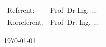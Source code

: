\begin{titlepage}
	\vspace{2.1cm}

	\centering \begin{minipage}[t]{9cm}
		\centering \begin{tabular}{ll}
			Referent: & Prof. Dr-Ing. ...\\
			Korreferent: & Prof. Dr.-Ing. ...\\
		\end{tabular}
	\end{minipage}

	\vspace{7cm}



	\centering %
	\begin{minipage}[b]{5cm}
			\centering
			\today\\ %
	\end{minipage}

	\restoregeometry
\end{titlepage}
